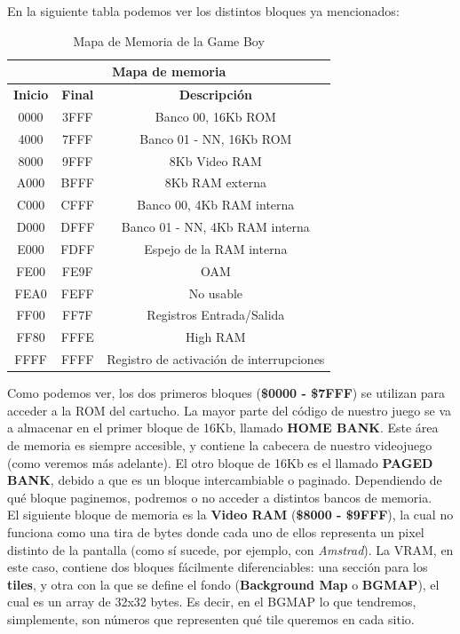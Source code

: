 En la siguiente tabla podemos ver los distintos bloques ya mencionados:

\begin{table}[h!]
\centering
\begin{tabular}{ |c|c|c| }
\hline
\multicolumn{3}{|c|}{\textbf{Mapa de memoria}}              \\ \hline
\textbf{Inicio} & \textbf{Final} & \textbf{Descripción}     \\ \hline
0000   & 3FFF  & Banco 00, 16Kb ROM                         \\ \hline
4000   & 7FFF  & Banco 01 - NN, 16Kb ROM                    \\ \hline
8000   & 9FFF  & 8Kb Video RAM                              \\ \hline
A000   & BFFF  & 8Kb RAM externa                            \\ \hline
C000   & CFFF  & Banco 00, 4Kb RAM interna                  \\ \hline
D000   & DFFF  & Banco 01 - NN, 4Kb RAM interna             \\ \hline
E000   & FDFF  & Espejo de la RAM interna                   \\ \hline
FE00   & FE9F  & OAM                                        \\ \hline
FEA0   & FEFF  & No usable                                  \\ \hline
FF00   & FF7F  & Registros Entrada/Salida                   \\ \hline
FF80   & FFFE  & High RAM                                   \\ \hline
FFFF   & FFFF  & Registro de activación de interrupciones   \\ \hline
\end{tabular}
\caption{Mapa de Memoria de la Game Boy}
\label{table:3}
\end{table}

Como podemos ver, los dos primeros bloques (\textbf{\$0000 - \$7FFF}) se utilizan para acceder a la ROM del cartucho. La mayor parte del código de nuestro juego se va a almacenar en el primer bloque de 16Kb, llamado \textbf{HOME BANK}. Este área de memoria es siempre accesible, y contiene la cabecera de nuestro videojuego (como veremos más adelante). El otro bloque de 16Kb es el llamado \textbf{PAGED BANK}, debido a que es un bloque intercambiable o paginado. Dependiendo de qué bloque paginemos, podremos o no acceder a distintos bancos de memoria.
\\ 
El siguiente bloque de memoria es la \textbf{Video RAM} (\textbf{\$8000 - \$9FFF}), la cual no funciona como una tira de bytes donde cada uno de ellos representa un pixel distinto de la pantalla (como sí sucede, por ejemplo, con \textit{Amstrad}). La VRAM, en este caso, contiene dos bloques fácilmente diferenciables: una sección para los \textbf{tiles}, y otra con la que se define el fondo (\textbf{Background Map} o \textbf{BGMAP}), el cual es un array de 32x32 bytes. Es decir, en el BGMAP lo que tendremos, simplemente, son números que representen qué tile queremos en cada sitio. 

